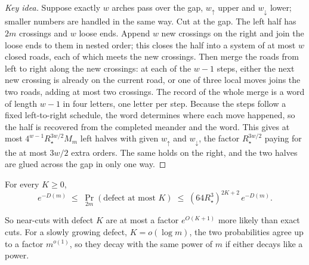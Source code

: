 \begin{proof}[Key idea]
Suppose exactly $w$ arches pass over the gap, $w_\uparrow$ upper and $w_\downarrow$ lower; smaller numbers are handled
in the same way. Cut at the gap. The left half has $2m$ crossings and $w$ loose ends. Append
$w$ new crossings on the right and join the loose ends to them in nested order; this closes the half
into a system of at most $w$ closed roads, each of which meets the new crossings. Then merge the roads
from left to right along the new crossings: at each of the $w-1$ steps, either the next new crossing
is already on the current road, or one of three local moves joins the two roads, adding at most two
crossings. The record of the whole merge is a word of length $w-1$ in four letters, one letter per
step. Because the steps follow a fixed left-to-right schedule, the word determines where each move
happened, so the half is recovered from the completed meander and the word. This gives at most $4^{w-1}R_\star^{3w/2}M_m$ left halves with given $w_\uparrow$ and $w_\downarrow$, the factor
$R_\star^{3w/2}$ paying for the at most $3w/2$ extra orders. The same holds on the right, and the two
halves are glued across the gap in only one way.
\end{proof}

\begin{corollary}\label{cor:defect}
For every $K\ge0$,
\[ e^{-D(m)}\;\le\;\Pr_{2m}(\text{defect at most }K)\;\le\;(64R_\star^3)^{2K+2}\,e^{-D(m)} . \]
\end{corollary}

So near-cuts with defect $K$ are at most a factor $e^{O(K+1)}$ more likely than exact cuts. For a
slowly growing defect, $K=o(\log m)$, the two probabilities agree up to a factor $m^{o(1)}$, so they
decay with the same power of $m$ if either decays like a power.
